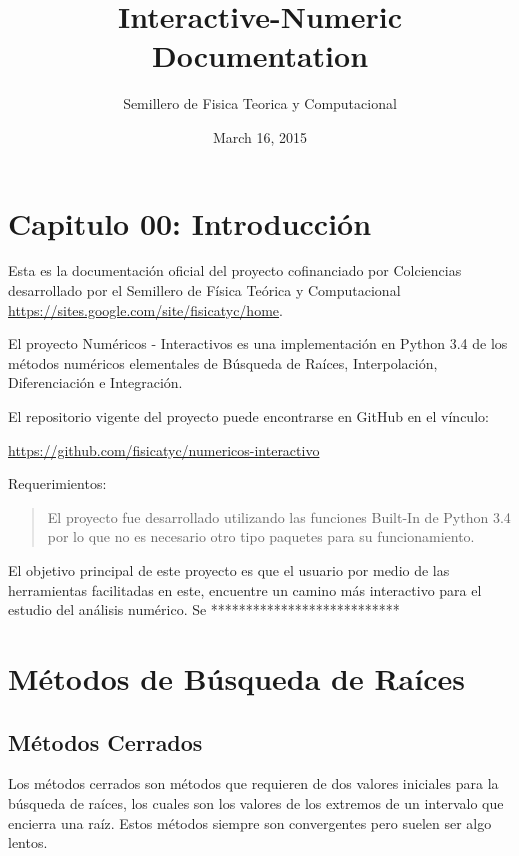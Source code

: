 \documentclass[letterpaper,10pt,oneside]{sphinxmanual}
\title{Interactive-Numeric Documentation}
\date{March 16, 2015}
\author{Semillero de Fisica Teorica y Computacional}
\theoremstyle{plain}%
\theoremstyle{definition}%
\theoremstyle{remark}%
\begin{document}
\maketitle
\tableofcontents
{}\label{index::doc}

\chapter{Capitulo 00: Introducción}
\label{chapter00::doc}\label{chapter00:capitulo-01-interpoladores}


\noindent Esta es la documentación oficial del proyecto cofinanciado por Colciencias desarrollado por el Semillero de Física Teórica y Computacional \href{https://sites.google.com/site/fisicatyc/home}{https://sites.google.com/site/fisicatyc/home}.

El proyecto Numéricos - Interactivos es una implementación en Python 3.4 de los métodos numéricos
elementales de Búsqueda de Raíces, Interpolación, Diferenciación e Integración.

El repositorio vigente del proyecto puede encontrarse en GitHub en el vínculo:

\href{https://github.com/fisicatyc/numericos-interactivo}{https://github.com/fisicatyc/numericos-interactivo}

Requerimientos:
\begin{quote}

El proyecto fue desarrollado utilizando las funciones Built-In de Python 3.4 por lo que no es
necesario otro tipo paquetes para su funcionamiento.
\end{quote}

El objetivo principal de este proyecto es que el usuario por medio de las herramientas facilitadas en este, encuentre un camino más interactivo para el estudio del análisis numérico. Se ***************************

\chapter[Búsqueda de Raíces]{Métodos de Búsqueda de Raíces}

\section{Métodos Cerrados}
\noindent Los métodos cerrados son métodos que requieren de dos valores iniciales para la búsqueda de
raíces, los cuales son los valores de los extremos de un intervalo que encierra una raíz. Estos
métodos siempre son convergentes pero suelen ser algo lentos.\medskip
\end{document}
